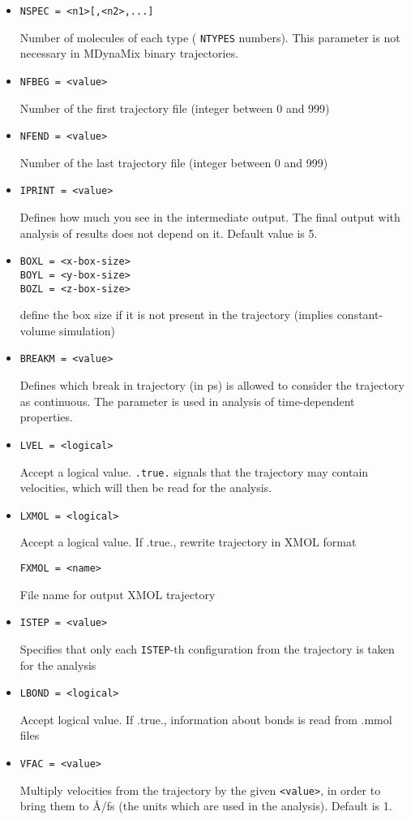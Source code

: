 \documentclass{article}
\begin{document}
\begin{itemize}
\item
\verb|NSPEC = <n1>[,<n2>,...]|

Number of molecules of each type ( \verb|NTYPES| numbers). This parameter
is not necessary in MDynaMix binary trajectories.

\item
\verb|NFBEG = <value>|

Number of the first trajectory file (integer between 0 and 999) 

\item
\verb|NFEND = <value>|

Number of the last trajectory file (integer between 0 and 999)

\item
\verb|IPRINT = <value>|

Defines how much you see in the intermediate output. The final output with
analysis of results does not depend on it. Default value is 5.

\item
\begin{verbatim}
BOXL = <x-box-size>
BOYL = <y-box-size>
BOZL = <z-box-size>
\end{verbatim}
define the box size if it is not present in the trajectory
(implies constant-volume simulation)

\item
\verb|BREAKM = <value>|

Defines which break in trajectory (in ps) is allowed to consider the 
trajectory as continuous. The parameter is used in analysis of time-dependent 
properties.

\item
\verb|LVEL = <logical>|

Accept a logical value. \verb|.true.| signals that the trajectory 
may contain velocities, which will then be read for the analysis.

\item
\verb|LXMOL = <logical>|

Accept a logical value. If .true., rewrite trajectory in XMOL format

\verb|FXMOL = <name>|

File name for output XMOL trajectory

\item
\verb|ISTEP = <value>|

Specifies that only each \verb|ISTEP|-th configuration from the trajectory 
is taken for the analysis

\item
\verb|LBOND = <logical>|

Accept logical value. If .true., information about bonds is read 
from .mmol files

\item
\verb|VFAC = <value>| 

Multiply velocities from the trajectory by the given \verb|<value>|, 
in order to bring them to \AA/fs (the units which are used in the analysis). 
Default is 1.

\end{itemize}
\end{document}
